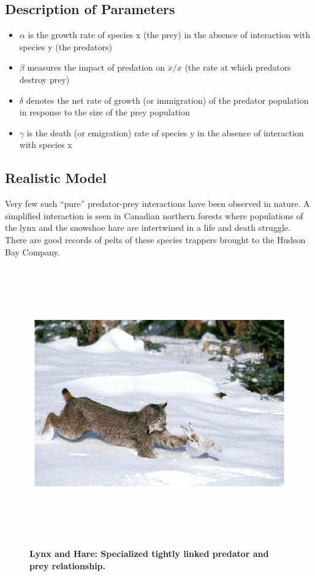 \documentclass[12pt]{article}
\begin{document}
\subsection*{Description of Parameters}
\begin{itemize}
    \item $\alpha$ is the growth rate of species x (the prey) in the absence of interaction with species y (the predators)
    \item $\beta$ measures the impact of predation on $ \dot{x}/x $ (the rate at which predators destroy prey)
    \item $\delta$ denotes the net rate of growth (or immigration) of the predator population in response to the size of the prey population
    \item  $\gamma$ is the death (or emigration) rate of species y in the absence of interaction with species x
\end{itemize} 

\subsection*{Realistic Model}
Very few such “pure” predator-prey interactions have been observed in nature. A simplified interaction is seen in Canadian northern forests where populations of the lynx and the snowshoe hare are intertwined in a life and death struggle. There are good records of pelts of these species trappers brought to the Hudson Bay Company.

\begin{figure}[h] 
    \centering
    \includegraphics[width=15cm,height=12cm]{Photograph-of-Canadian-Lynx-and-Snowshoe-Hare-Balance-Problem-Used-in-Consolidity-Theory.png}
\caption{\bf{Lynx and Hare: Specialized tightly linked predator and prey relationship.\cite{noauthor_photograph_nodate}}}
\end{figure}
\newpage
\end{document}
